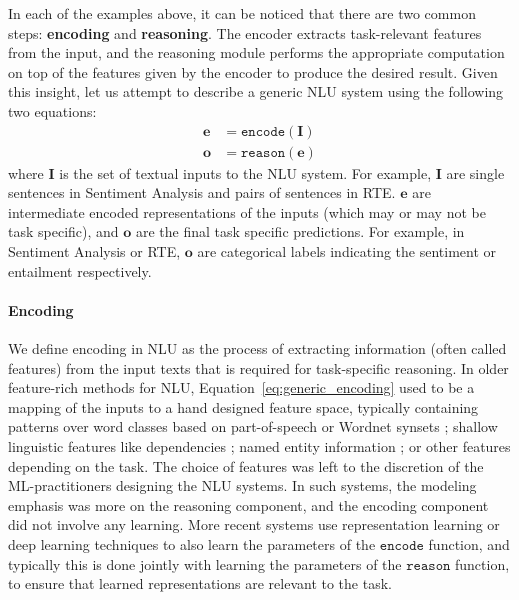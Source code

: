 In each of the examples above, it can be noticed that there are two common steps: \textbf{encoding}
and \textbf{reasoning}. The encoder extracts task-relevant features from the input, and the
reasoning module performs the appropriate computation on top of the features given by the encoder to
produce the desired result. Given this insight, let us attempt to describe a generic NLU system
using the following two equations: \begin{align} \mathbf{e} &= \mathtt{encode}(\mathbf{I})
\label{eq:generic_encoding}\\ \mathbf{o} &= \mathtt{reason}(\mathbf{e}) \label{eq:generic_reasoning}
\end{align} where $\mathbf{I}$ is the set of textual inputs to the NLU system.  For example,
$\mathbf{I}$  are single sentences in Sentiment Analysis and pairs of sentences in RTE\@.
$\textbf{e}$ are intermediate encoded representations of the inputs (which may or may not be task
specific), and $\mathbf{o}$ are the final task specific predictions. For example, in Sentiment
Analysis or RTE, $\mathbf{o}$ are categorical labels indicating the sentiment or entailment
respectively.

\paragraph{Encoding} We define encoding in NLU as the process of extracting information (often called
features) from the input texts that is required for task-specific reasoning.
In older feature-rich methods for NLU, Equation~\ref{eq:generic_encoding} used
to be a mapping of the inputs to a hand designed feature space, typically containing patterns over
word classes based on part-of-speech \citep{corley2005measuring} or Wordnet synsets
\citep{moldovan2001logic}; shallow linguistic features like dependencies \citep{bos2005recognising};
named entity information \citep{tatu2005semantic}; or other features depending on the task. The
choice of features was left to the discretion of the ML-practitioners designing the NLU systems. In
such systems, the modeling emphasis was more on the reasoning component, and the encoding component
did not involve any learning.  More recent systems \citep[among many
others]{bahdanau:14,weston2014memory,hermann2015teaching,Xiong2016DynamicMN,bowman2016fast,yang:16}
use representation learning or deep learning techniques to also learn the parameters of the
$\mathtt{encode}$ function, and typically this is done jointly with learning the parameters of the
$\mathtt{reason}$ function, to ensure that learned representations are relevant to the task.

